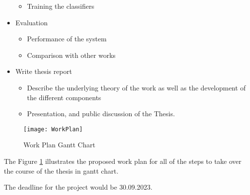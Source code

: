 \begin{itemize}
\begin{itemize}
         \item Training the classifiers
       \end{itemize}
\item Evaluation
     \begin{itemize}
         \item 	Performance of the system
         \item Comparison with other works
       \end{itemize}
\item Write thesis report
     \begin{itemize}
         \item Describe the underlying theory of the work as well as the development of the different components
         \item Presentation, and public discussion of the Thesis.
       \end{itemize}
\end{itemize}

\begin{figure}[ht]
	\centering
	\texttt{[image: WorkPlan]}
	  \caption{ Work Plan Gantt Chart }
  \label{fig:workPlanGanttChart}
\end{figure}

The Figure \ref{fig:workPlanGanttChart} illustrates the proposed work plan for all of the steps to take over the course of the thesis in gantt chart.

The deadline for the project would be 30.09.2023.

